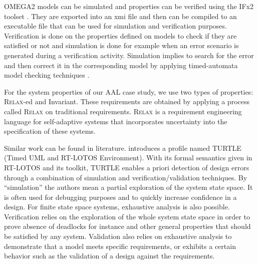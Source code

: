 \documentclass[a4paper,twoside]{article}
\def\myrelax{\textsc{Relax}}                  %
\def\sysml{\textsc{SysML}}
\def\uml{\textsc{UML}}
\begin{document}
OMEGA2 models can be simulated and properties can be verified using the IFx2 toolset \cite{test4}. 
They are exported into an xmi file and then can be compiled to an executable file that can be used for simulation and verification purposes. Verification is done on the properties defined on models to check if they are satisfied or not and simulation is done for example when an error scenario is generated during a verification activity. Simulation implies to search for the error and then correct it in the corresponding model  by applying timed-automata model checking techniques \cite{test5}.

For the system properties of our AAL case study, we use two types of properties: \myrelax{}-ed and Invariant. These requirements are obtained by applying a process called  \myrelax{} \cite{test6} on traditional requirements. \myrelax{}  is  a  requirement  engineering language for self-adaptive systems that incorporates uncertainty into the specification of these systems.

Similar work can be found in literature. \cite{test7} introduces a profile named TURTLE (Timed UML and RT-LOTOS Environment). With its formal semantics given in RT-LOTOS and its toolkit, TURTLE enables a priori detection of design errors through a combination of simulation and verification/validation techniques. By “simulation” the authors mean a partial exploration of the system state space. It is often used for debugging purposes and to quickly increase confidence in a design. For finite state space systems, exhaustive analysis is also possible. Verification relies 
on the exploration of the whole system state space in order to prove absence of deadlocks for instance and other general properties that should be satisfied by any system. Validation also relies on exhaustive analysis to demonstrate that a model meets specific requirements, or exhibits a certain behavior  such as the validation of a design against the requirements.
\end{document}
